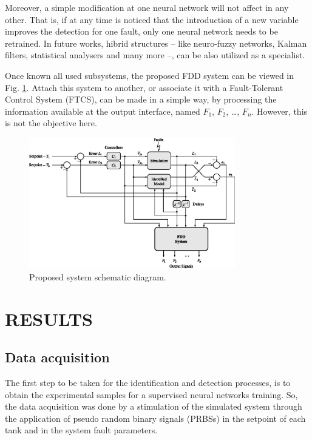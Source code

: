 \documentclass[10pt,fleqn,a4paper]{article}
\newcommand{\sequencia}[4]{$#1_{#2}$, $#1_{#3}$, \ldots, $#1_{#4}$}
\begin{document}
Moreover, a simple modification at one neural network will not affect in any
other. That is, if at any time is noticed that the introduction of a new
variable improves the detection for one fault, only one neural network needs to
be retrained. In future works, hibrid structures -- like neuro-fuzzy networks,
Kalman filters, statistical analysers and many more --, can be also utilized as
a specialist.

Once known all used subsystems, the proposed FDD system can be viewed in Fig.
\ref{fig:comp}. Attach this system to another, or associate it with a
Fault-Tolerant Control System (FTCS), can be made in a simple way, by processing
the information available at the output interface, named
\sequencia{F}{1}{2}{n}. However, this is not the objective here.

\begin{figure}[htb]
\centering
    \includegraphics[width=0.8\textwidth]{imgs/comp}
    \caption{Proposed system schematic diagram.}
    \label{fig:comp}
\end{figure}

\section{RESULTS}\label{sec:results}

\subsection{Data acquisition}
The first step to be taken for the identification and detection processes, is to
obtain the experimental samples for a supervised neural networks training. So,
the data acquisition was done by a stimulation of the simulated system through
the application of pseudo random binary signals (PRBSs) in the setpoint of each
tank and in the system fault parameters.
\end{document}
